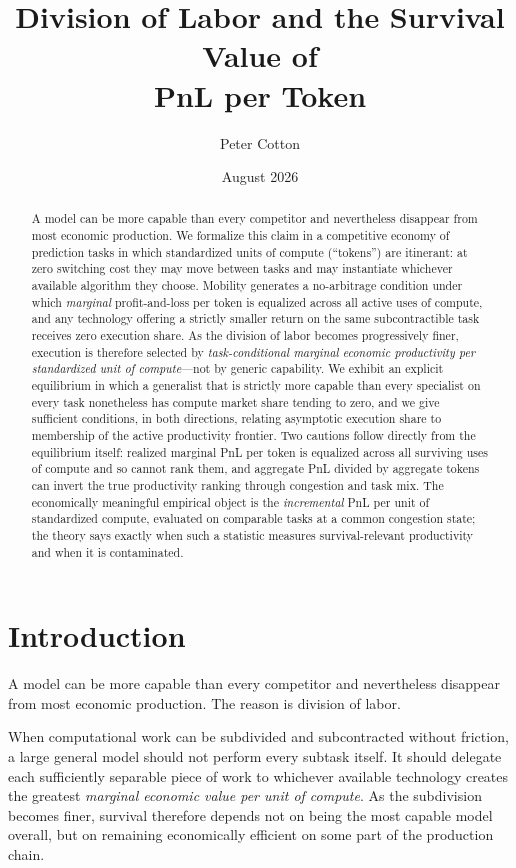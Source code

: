 \documentclass[11pt]{article}
\title{Division of Labor and the Survival Value of\\ PnL per Token}
\author{Peter Cotton}
\date{August 2026}
\theoremstyle{definition}
\theoremstyle{remark}
\begin{document}
\maketitle

\begin{abstract}
A model can be more capable than every competitor and nevertheless disappear from most economic production. We formalize this claim in a competitive economy of prediction tasks in which standardized units of compute (``tokens'') are itinerant: at zero switching cost they may move between tasks and may instantiate whichever available algorithm they choose. Mobility generates a no-arbitrage condition under which \emph{marginal} profit-and-loss per token is equalized across all active uses of compute, and any technology offering a strictly smaller return on the same subcontractible task receives zero execution share. As the division of labor becomes progressively finer, execution is therefore selected by \emph{task-conditional marginal economic productivity per standardized unit of compute}---not by generic capability. We exhibit an explicit equilibrium in which a generalist that is strictly more capable than every specialist on every task nonetheless has compute market share tending to zero, and we give sufficient conditions, in both directions, relating asymptotic execution share to membership of the active productivity frontier. Two cautions follow directly from the equilibrium itself: realized marginal PnL per token is equalized across all surviving uses of compute and so cannot rank them, and aggregate PnL divided by aggregate tokens can invert the true productivity ranking through congestion and task mix. The economically meaningful empirical object is the \emph{incremental} PnL per unit of standardized compute, evaluated on comparable tasks at a common congestion state; the theory says exactly when such a statistic measures survival-relevant productivity and when it is contaminated.
\end{abstract}

\section{Introduction}

A model can be more capable than every competitor and nevertheless disappear from most economic production. The reason is division of labor.

When computational work can be subdivided and subcontracted without friction, a large general model should not perform every subtask itself. It should delegate each sufficiently separable piece of work to whichever available technology creates the greatest \emph{marginal economic value per unit of compute}. As the subdivision becomes finer, survival therefore depends not on being the most capable model overall, but on remaining economically efficient on some part of the production chain.
\end{document}
